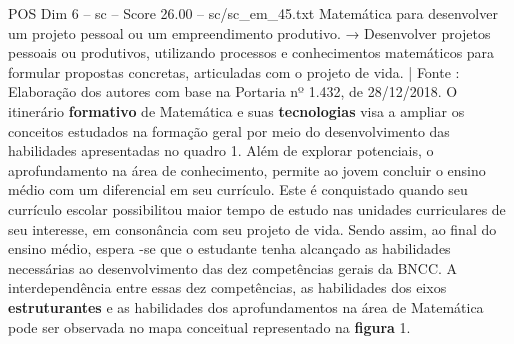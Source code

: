 \begin{textsample}{POS Dim 6 – sc – Score 26.00 – sc/sc\_em\_45.txt}
Matemática para desenvolver um projeto pessoal ou um empreendimento produtivo. → Desenvolver projetos pessoais ou produtivos, utilizando processos e conhecimentos matemáticos para formular propostas concretas, articuladas com o projeto de vida. | Fonte : Elaboração dos autores com base na Portaria nº 1.432, de 28/12/2018.
O itinerário \textbf{formativo} de Matemática e suas \textbf{tecnologias} visa a ampliar os conceitos estudados na formação geral por meio do desenvolvimento das habilidades apresentadas no quadro 1.
Além de explorar potenciais, o aprofundamento na área de conhecimento, permite ao jovem concluir o ensino médio com um diferencial em seu currículo.
Este é conquistado quando seu currículo escolar possibilitou maior tempo de estudo nas unidades curriculares de seu interesse, em consonância com seu projeto de vida.
Sendo assim, ao final do ensino médio, espera -se que o estudante tenha alcançado as habilidades necessárias ao desenvolvimento das dez competências gerais da BNCC.
A interdependência entre essas dez competências, as habilidades dos eixos \textbf{estruturantes} e as habilidades dos aprofundamentos na área de Matemática pode ser observada no mapa conceitual representado na \textbf{figura} 1.

\end{textsample}
